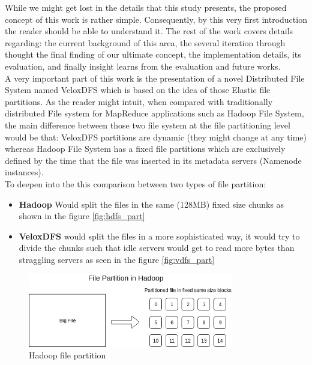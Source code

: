 While we might get lost in the details that this study presents, the proposed
concept of this work is rather simple. Consequently, by this very first
introduction the reader should be able to understand it. The rest of the work
covers details regarding: the current background of this area, the several
iteration through thought the final finding of our ultimate concept, the
implementation details, its evaluation, and finally insight learns from the
evaluation and future works.  \\

A very important part of this work is the presentation of a novel Distributed
File System named VeloxDFS which is based on the idea of those Elastic file
partitions. As the reader might intuit, when compared with traditionally
distributed File system for MapReduce applications such as Hadoop File System,
the main difference between those two file system at the file partitioning level
would be that: VeloxDFS partitions are dynamic (they might change at any time)
whereas Hadoop File System has a fixed file partitions which are exclusively
defined by the time that the file was inserted in its metadata servers (Namenode
instances).  \\

To deepen into the this comparison between two types of file partition:
\begin{itemize}
    \item \textbf{Hadoop} Would split the files in the same (128MB) fixed size chunks
          as shown in the figure \ref{fig:hdfs_part}
          
    \item \textbf{VeloxDFS} would split the files in a more sophisticated way, it would try
        to divide the chunks such that idle servers would get to read more bytes than straggling servers
        as seen in the figure \ref{fig:vdfs_part}
\end{itemize}


\label{fig:hdfs_part}
\begin{figure}[H]
    \centering
    \includegraphics[width=0.8\textwidth]{figures/hadoop_partition.png}
    \caption{Hadoop file partition}
\end{figure}

